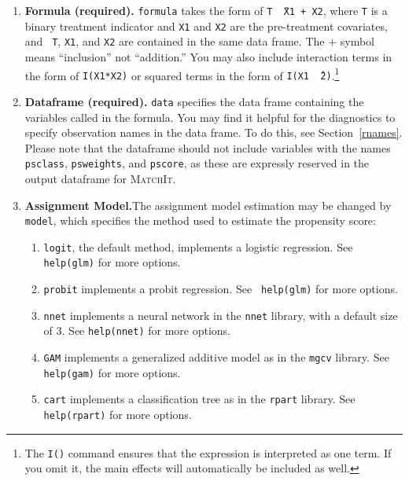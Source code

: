 \documentclass[oneside,letterpaper,titlepage]{article}
\newcommand{\MatchIt}{\textsc{MatchIt}}
\begin{document}
\begin{enumerate}
  
\item \textbf{Formula (required).}  \texttt{formula} takes the form of
  {\tt T \~\ X1 + X2}, where {\tt T} is a binary treatment indicator
  and {\tt X1} and {\tt X2} are the pre-treatment covariates, and {\tt
    T}, {\tt X1}, and {\tt X2} are contained in the same data frame.
  The $+$ symbol means ``inclusion'' not ``addition.'' You may also
  include interaction terms in the form of {\tt I(X1*X2)} or squared
  terms in the form of {\tt I(X1 \^\ 2)}.\footnote{The \texttt{I()}
    command ensures that the expression is interpreted as one term.
    If you omit it, the main effects will automatically be included as
    well.}
  
\item \textbf{Dataframe (required).}  \texttt{data} specifies the data
  frame containing the variables called in the formula.  You may find
  it helpful for the diagnostics to specify observation names in the
  data frame.  To do this, see Section~\ref{rnames}.  Please note that
  the dataframe should not include variables with the names
  \texttt{psclass}, \texttt{psweights}, and \texttt{pscore}, as these
  are expressly reserved in the output dataframe for \MatchIt. 
  
\item \textbf{Assignment Model.}The assignment model estimation may be
  changed by \texttt{model}, which specifies the method used to
  estimate the propensity score:
  \begin{enumerate}
  \item \texttt{logit}, the default method, implements a logistic
    regression.  See {\tt help(glm)} for more options.
  \item \texttt{probit} implements a probit regression.  See {\tt
      help(glm)} for more options.
  \item \texttt{nnet} implements a neural network in the \texttt{nnet}
    library, with a default size of 3.  See {\tt help(nnet)} for more
    options.
  \item \texttt{GAM} implements a generalized additive model as in the
    \texttt{mgcv} library.  See {\tt help(gam)} for more options.
  \item \texttt{cart} implements a classification tree as in the
    \texttt{rpart} library.  See {\tt help(rpart)} for more options.
  \end{enumerate}
  

\end{enumerate}
\end{document}
